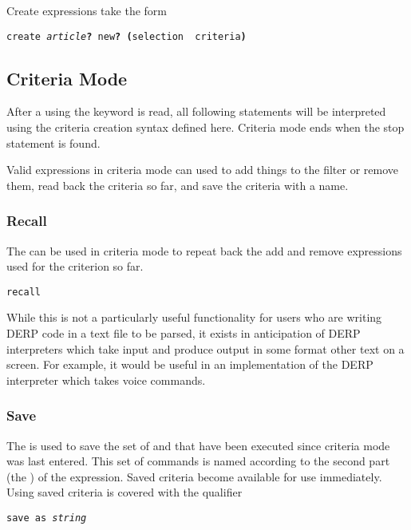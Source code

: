 Create expressions take the form
\begin{description}[labelindent=1cm,leftmargin=\onelen,labelwidth=1cm]
     \texttt{create \textit{article}\textbf{?} new\textbf{?} \textbf{(}selection \textbf{\textbar} criteria\textbf{)}}
\end{description}

\subsection{Criteria Mode}
After a  using the keyword  is read, all following statements will be interpreted using
the criteria creation syntax defined here. Criteria mode ends when the stop statement is found.

Valid expressions in criteria mode can used to add things to the filter or remove them, read back the criteria so
far, and save the criteria with a name.

\subsubsection{Recall}
The  can be used in criteria mode to repeat back the add and remove expressions used for the
criterion so far.
\begin{description}[labelindent=1cm,leftmargin=\onelen,labelwidth=1cm]
      \texttt{recall}
\end{description}
While this is not a particularly useful functionality for users who are writing DERP code in a text file to be
parsed, it exists in anticipation of DERP interpreters which take input and produce output in some format other
text on a screen. For example, it would be useful in an implementation of the DERP interpreter which takes voice
commands.


\subsubsection{Save}
The  is used to save the set of  and  that have been executed since
criteria mode was last entered. This set of commands is named according to the second part (the ) of the
expression. Saved criteria become available for use immediately. Using saved criteria is covered with the  qualifier
\begin{description}[labelindent=1cm,leftmargin=\onelen,labelwidth=1cm]
     \texttt{save as \textit{string}}
\end{description}

